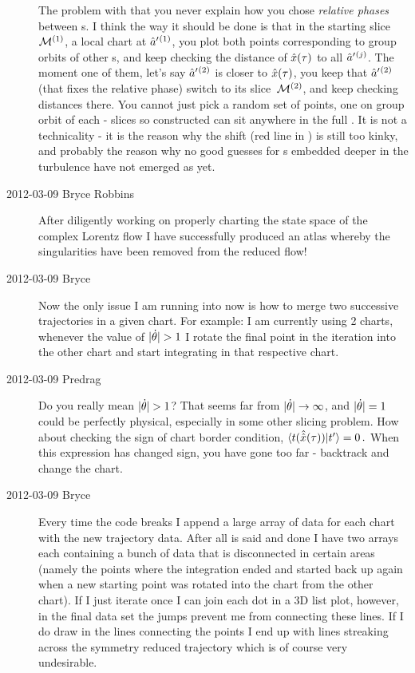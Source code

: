 \begin{description}
    The problem with  that you never explain how
    you chose \emph{relative phases} between \template s. I think the way
    it should be done is that in the starting slice\ ${\cal M}{}^{(1)}$, a
    local chart at $\hat{a}'{}^{(1)}$, you plot both points corresponding
    to group orbits of other \template s, and keep checking the distance of
    $\hat{x}(\tau)$ to all $\hat{a}'{}^{(j)}$. The moment one of them,
    let's say $\hat{a}'{}^{(2)}$ is closer to $\hat{x}(\tau)$, you keep
    that $\hat{a}'{}^{(2)}$ (that fixes the relative phase) switch to its
    slice\ ${\cal M}{}^{(2)}$, and keep checking distances there. You cannot
    just pick a random set of points, one on group orbit of each {\template}
    - slices so constructed can sit anywhere in the full \statesp. It is
    not a technicality - it is the reason why the shift (red line in
    ) is still too kinky, and probably the reason
    why no good guesses for \rpo s embedded deeper in the turbulence have
    not emerged as yet.

\item[2012-03-09 Bryce Robbins]
After diligently working on properly charting the state space of the
complex Lorentz flow I have successfully produced an atlas whereby the
singularities have been removed from the reduced flow!

\item[2012-03-09 Bryce]
Now the only issue I am running into now is how to merge two successive
trajectories in a given chart. For example: I am currently using 2
charts, whenever the value of  $|\dot{\gSpace}|>1$  I rotate the final point
in the iteration into the other chart and start integrating in that
respective chart.

\item[2012-03-09 Predrag]
Do you really mean  $|\dot{\gSpace}|>1$? That seems far from $|\dot{\theta}|
\to \infty$, and $|\dot{\theta}|=1$ could be perfectly physical, especially
in some other slicing problem. How about checking the sign of chart
border condition,
\(
\langle{t(\hat{\ensuremath{\hat{x}}}(\ensuremath{\tau}))}\vphantom{ }|\vphantom{}t'\rangle= 0
\,.
\)
When this expression has changed sign, you have gone too far - backtrack
and change the chart.

\item[2012-03-09 Bryce]
Every time the code breaks I append a large array of data for each chart
with the new trajectory data. After all is said and done I have two
arrays each containing a bunch of data that is disconnected in certain
areas (namely the points where the integration ended and started back up
again when a new starting point was rotated into the chart from the other
chart). If I just iterate once I can join each dot in a 3D list plot,
however, in the final data set the jumps prevent me from connecting these
lines. If I do draw in the lines connecting the points I end up with
lines streaking across the symmetry reduced trajectory which is of course
very undesirable.


\end{description}
